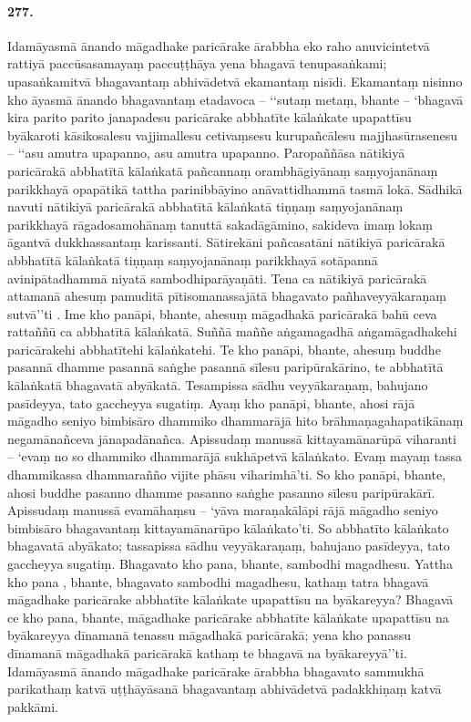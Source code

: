 \paragraph{277.} Idamāyasmā ānando māgadhake paricārake ārabbha eko raho anuvicintetvā rattiyā paccūsasamayaṃ paccuṭṭhāya yena bhagavā tenupasaṅkami; upasaṅkamitvā bhagavantaṃ abhivādetvā ekamantaṃ nisīdi. Ekamantaṃ nisinno kho āyasmā ānando bhagavantaṃ etadavoca – ‘‘sutaṃ metaṃ, bhante – ‘bhagavā kira parito parito janapadesu paricārake abbhatīte kālaṅkate upapattīsu byākaroti kāsikosalesu vajjimallesu cetivaṃsesu kurupañcālesu majjhasūrasenesu – ‘‘asu amutra upapanno, asu amutra upapanno. Paropaññāsa nātikiyā paricārakā abbhatītā kālaṅkatā pañcannaṃ orambhāgiyānaṃ saṃyojanānaṃ parikkhayā opapātikā tattha parinibbāyino anāvattidhammā tasmā lokā. Sādhikā navuti nātikiyā paricārakā abbhatītā kālaṅkatā tiṇṇaṃ saṃyojanānaṃ parikkhayā rāgadosamohānaṃ tanuttā sakadāgāmino, sakideva imaṃ lokaṃ āgantvā dukkhassantaṃ karissanti. Sātirekāni pañcasatāni nātikiyā paricārakā abbhatītā kālaṅkatā tiṇṇaṃ saṃyojanānaṃ parikkhayā sotāpannā avinipātadhammā niyatā sambodhiparāyaṇāti. Tena ca nātikiyā paricārakā attamanā ahesuṃ pamuditā pītisomanassajātā bhagavato pañhaveyyākaraṇaṃ sutvā’’ti . Ime kho panāpi, bhante, ahesuṃ māgadhakā paricārakā bahū ceva rattaññū ca abbhatītā kālaṅkatā. Suññā maññe aṅgamagadhā aṅgamāgadhakehi paricārakehi abbhatītehi kālaṅkatehi. Te kho panāpi, bhante, ahesuṃ buddhe pasannā dhamme pasannā saṅghe pasannā sīlesu paripūrakārino, te abbhatītā kālaṅkatā bhagavatā abyākatā. Tesampissa sādhu veyyākaraṇaṃ, bahujano pasīdeyya, tato gaccheyya sugatiṃ. Ayaṃ kho panāpi, bhante, ahosi rājā māgadho seniyo bimbisāro dhammiko dhammarājā hito brāhmaṇagahapatikānaṃ negamānañceva jānapadānañca. Apissudaṃ manussā kittayamānarūpā viharanti – ‘evaṃ no so dhammiko dhammarājā sukhāpetvā kālaṅkato. Evaṃ mayaṃ tassa dhammikassa dhammarañño vijite phāsu viharimhā’ti. So kho panāpi, bhante, ahosi buddhe pasanno dhamme pasanno saṅghe pasanno sīlesu paripūrakārī. Apissudaṃ manussā evamāhaṃsu – ‘yāva maraṇakālāpi rājā māgadho seniyo bimbisāro bhagavantaṃ kittayamānarūpo kālaṅkato’ti. So abbhatīto kālaṅkato bhagavatā abyākato; tassapissa sādhu veyyākaraṇaṃ, bahujano pasīdeyya, tato gaccheyya sugatiṃ. Bhagavato kho pana, bhante, sambodhi magadhesu. Yattha kho pana , bhante, bhagavato sambodhi magadhesu, kathaṃ tatra bhagavā māgadhake paricārake abbhatīte kālaṅkate upapattīsu na byākareyya? Bhagavā ce kho pana, bhante, māgadhake paricārake abbhatīte kālaṅkate upapattīsu na byākareyya dīnamanā tenassu māgadhakā paricārakā; yena kho panassu dīnamanā māgadhakā paricārakā kathaṃ te bhagavā na byākareyyā’’ti. Idamāyasmā ānando māgadhake paricārake ārabbha bhagavato sammukhā parikathaṃ katvā uṭṭhāyāsanā bhagavantaṃ abhivādetvā padakkhiṇaṃ katvā pakkāmi.

